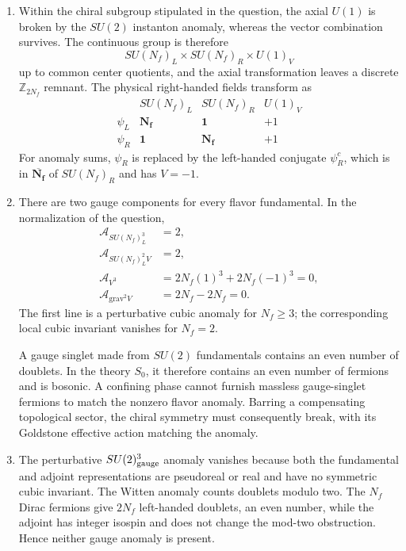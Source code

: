 \begin{enumerate}
  \begin{enumerate}
    \item[(i)]
    Within the chiral subgroup stipulated in the question, the axial
    \(U(1)\) is broken by the \(SU(2)\) instanton anomaly, whereas the
    vector combination survives.  The continuous group is therefore
    \[
      SU(N_f)_L\times SU(N_f)_R\times U(1)_V
    \]
    up to common center quotients, and the axial transformation leaves a
    discrete \(\mathbb Z_{2N_f}\) remnant.  The physical right-handed
    fields transform as
    \[
    \begin{array}{c|ccc}
       &SU(N_f)_L&SU(N_f)_R&U(1)_V\\ \hline
      \psi_L&\mathbf{N_f}&\mathbf1&+1\\
      \psi_R&\mathbf1&\mathbf{N_f}&+1
    \end{array}
    \]
    For anomaly sums, \(\psi_R\) is replaced by the left-handed conjugate
    \(\psi_R^c\), which is in
    \(\overline{\mathbf{N_f}}\) of \(SU(N_f)_R\) and has \(V=-1\).

    \item[(ii)]
    There are two gauge components for every flavor fundamental.  In the
    normalization of the question,
    \[
    \begin{aligned}
      \mathcal A_{SU(N_f)_L^3}&=2,\\
      \mathcal A_{SU(N_f)_L^2V}&=2,\\
      \mathcal A_{V^3}
       &=2N_f(1)^3+2N_f(-1)^3=0,\\
      \mathcal A_{\mathrm{grav}^2V}
       &=2N_f-2N_f=0.
    \end{aligned}
    \]
    The first line is a perturbative cubic anomaly for \(N_f\ge3\);
    the corresponding local cubic invariant vanishes for \(N_f=2\).

    A gauge singlet made from \(SU(2)\) fundamentals contains an even
    number of doublets.  In the theory \(S_0\), it therefore contains an
    even number of fermions and is bosonic.  A confining phase cannot
    furnish massless gauge-singlet fermions to match the nonzero flavor
    anomaly.  Barring a compensating topological sector, the chiral
    symmetry must consequently break, with its Goldstone effective action
    matching the anomaly.

    \item[(iii)]
    The perturbative \(SU(2)_{\rm gauge}^3\) anomaly vanishes because both
    the fundamental and adjoint representations are pseudoreal or real
    and have no symmetric cubic invariant.  The Witten anomaly counts
    doublets modulo two.  The \(N_f\) Dirac fermions give \(2N_f\)
    left-handed doublets, an even number, while the adjoint has integer
    isospin and does not change the mod-two obstruction.  Hence neither
    gauge anomaly is present.


\end{enumerate}
\end{enumerate}
